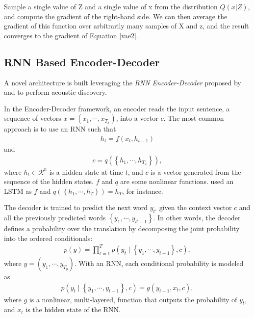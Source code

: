 \documentclass{article}
\begin{document}
Sample a single value of Z and a single value of x from the distribution $Q(x|Z)$, and compute the gradient of the right-hand side. We can then average the gradient of this function over arbitrarily many samples of X and z, and the result converges to the gradient of Equation \ref{vae2}.  
\subsection{RNN Based Encoder-Decoder}
A novel architecture is built leveraging the {\it RNN Encoder-Decoder} proposed by \citet{cho2014learning} and \citet{sutskever2014sequence} to perform acoustic discovery.

In the Encoder-Decoder framework, an encoder reads the input sentence, a
sequence of vectors $x=\left( x_1, \cdots, x_{T_x} \right)$, into a vector
$c$. The most common approach is to use an RNN such that  
\begin{align}
    \label{eq:forward_state}
    h_t = f\left( x_{t}, h_{t-1} \right)
\end{align}
and
\begin{align*}
    c = q\left(\left\{ h_1, \cdots, h_{T_x} \right\}\right),
\end{align*}
where $h_t \in \mathcal{R}^{n}$ is a hidden state at time $t$, and $c$ is a vector
generated from the sequence of the hidden states. $f$ and $q$ are some
nonlinear functions. \citet{sutskever2014sequence} used an LSTM as $f$ and
$q\left(\left\{ h_1, \cdots, h_T \right\}\right)=h_T$, for instance.

The decoder \cite{bahdanau2016neural} is trained to predict the next word $y_{t'}$ given the context vector $c$ and all the previously predicted words $\left\{ y_1, \cdots, y_{t'-1}
\right\}$. In other words, the decoder defines a probability over the translation by decomposing the joint probability into the ordered conditionals:
\begin{align}
    \label{eq:decoder_prob}
    p(y) = \prod_{t=1}^T p(y_t \mid \left\{ y_1, \cdots, y_{t-1} \right\}, c),
\end{align}
where $y = \left( y_1, \cdots, y_{T_y} \right)$. With an RNN, each conditional probability is modeled as
\begin{align}
    \label{eq:output_rnn}
    p(y_t \mid \left\{ y_1, \cdots, y_{t-1} \right\}, c) = g(y_{t-1}, x_{t}, c),
\end{align}
where $g$ is a nonlinear, multi-layered, function that outputs the probability of $y_t$, and $x_t$ is the hidden state of the RNN.   
\end{document}
